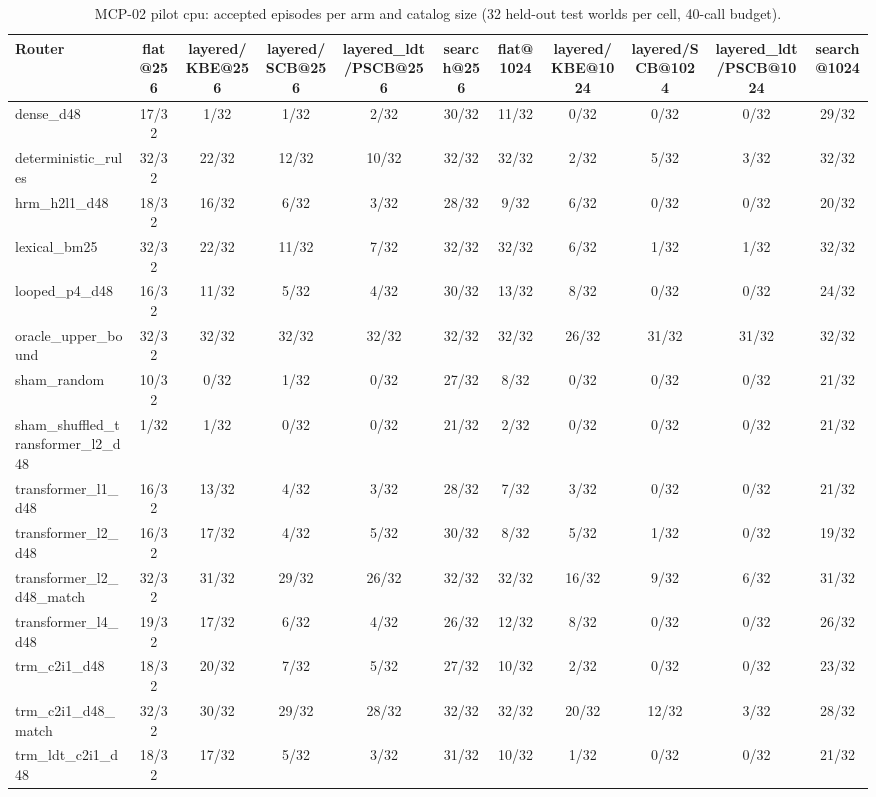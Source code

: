 \begin{table}[t]
\centering
\small
\begin{adjustbox}{max width=\linewidth}
\begin{tabular}{lcccccccccc}
\toprule
Router & flat@256 & layered/KBE@256 & layered/SCB@256 & layered\_ldt/PSCB@256 & search@256 & flat@1024 & layered/KBE@1024 & layered/SCB@1024 & layered\_ldt/PSCB@1024 & search@1024 \\
\midrule
dense\_d48 & 17/32 & 1/32 & 1/32 & 2/32 & 30/32 & 11/32 & 0/32 & 0/32 & 0/32 & 29/32 \\
deterministic\_rules & 32/32 & 22/32 & 12/32 & 10/32 & 32/32 & 32/32 & 2/32 & 5/32 & 3/32 & 32/32 \\
hrm\_h2l1\_d48 & 18/32 & 16/32 & 6/32 & 3/32 & 28/32 & 9/32 & 6/32 & 0/32 & 0/32 & 20/32 \\
lexical\_bm25 & 32/32 & 22/32 & 11/32 & 7/32 & 32/32 & 32/32 & 6/32 & 1/32 & 1/32 & 32/32 \\
looped\_p4\_d48 & 16/32 & 11/32 & 5/32 & 4/32 & 30/32 & 13/32 & 8/32 & 0/32 & 0/32 & 24/32 \\
oracle\_upper\_bound & 32/32 & 32/32 & 32/32 & 32/32 & 32/32 & 32/32 & 26/32 & 31/32 & 31/32 & 32/32 \\
sham\_random & 10/32 & 0/32 & 1/32 & 0/32 & 27/32 & 8/32 & 0/32 & 0/32 & 0/32 & 21/32 \\
sham\_shuffled\_transformer\_l2\_d48 & 1/32 & 1/32 & 0/32 & 0/32 & 21/32 & 2/32 & 0/32 & 0/32 & 0/32 & 21/32 \\
transformer\_l1\_d48 & 16/32 & 13/32 & 4/32 & 3/32 & 28/32 & 7/32 & 3/32 & 0/32 & 0/32 & 21/32 \\
transformer\_l2\_d48 & 16/32 & 17/32 & 4/32 & 5/32 & 30/32 & 8/32 & 5/32 & 1/32 & 0/32 & 19/32 \\
transformer\_l2\_d48\_match & 32/32 & 31/32 & 29/32 & 26/32 & 32/32 & 32/32 & 16/32 & 9/32 & 6/32 & 31/32 \\
transformer\_l4\_d48 & 19/32 & 17/32 & 6/32 & 4/32 & 26/32 & 12/32 & 8/32 & 0/32 & 0/32 & 26/32 \\
trm\_c2i1\_d48 & 18/32 & 20/32 & 7/32 & 5/32 & 27/32 & 10/32 & 2/32 & 0/32 & 0/32 & 23/32 \\
trm\_c2i1\_d48\_match & 32/32 & 30/32 & 29/32 & 28/32 & 32/32 & 32/32 & 20/32 & 12/32 & 3/32 & 28/32 \\
trm\_ldt\_c2i1\_d48 & 18/32 & 17/32 & 5/32 & 3/32 & 31/32 & 10/32 & 1/32 & 0/32 & 0/32 & 21/32 \\
\bottomrule
\end{tabular}
\end{adjustbox}
\caption{MCP-02 pilot cpu: accepted episodes per arm and catalog size (32 held-out test worlds per cell, 40-call budget).}
\label{tab:mcp02-pilot_cpu-success}
\end{table}
